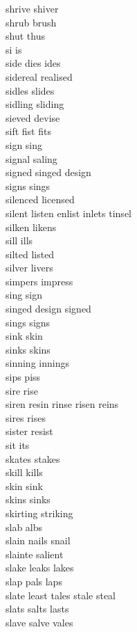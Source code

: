 shrive shiver\\
shrub brush\\
shut thus\\
si is\\
side dies ides\\
sidereal realised\\
sidles slides\\
sidling sliding\\
sieved devise\\
sift fist fits\\
sign sing\\
signal saling\\
signed singed design\\
signs sings\\
silenced licensed\\
silent listen enlist inlets tinsel\\
silken likens\\
sill ills\\
silted listed\\
silver livers\\
simpers impress\\
sing sign\\
singed design signed\\
sings signs\\
sink skin\\
sinks skins\\
sinning innings\\
sips piss\\
sire rise\\
siren resin rinse risen reins\\
sires rises\\
sister resist\\
sit its\\
skates stakes\\
skill kills\\
skin sink\\
skins sinks\\
skirting striking\\
slab albs\\
slain nails snail\\
slainte salient\\
slake leaks lakes\\
slap pals laps\\
slate least tales stale steal\\
slats salts lasts\\
slave salve vales\\
